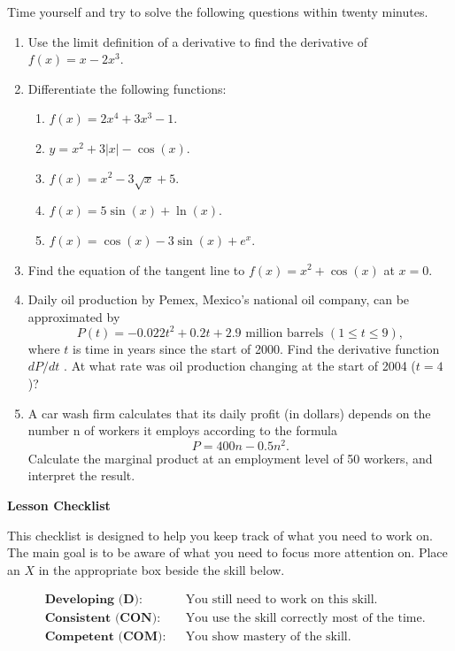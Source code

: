 \documentclass[10pt]{book}
\theoremstyle{definition}
\theoremstyle{remark}
\begin{document}
\begin{large}
\noindent
Time yourself and try to solve the following questions within twenty minutes. 
\begin{enumerate}
\item Use the limit definition of a derivative to find the derivative of $f (x) = x - 2x^3$.\vfil
\item Differentiate the following functions:
\begin{enumerate}
    \item  $f (x) = 2x^4 + 3x^3 -1$. 
    \item  $y = x^2 + 3|x| -\cos(x)$.
    \item  $f (x) = x^2 - 3\sqrt{x} + 5$.
    \item  $f (x) = 5\sin(x) + \ln(x)$.
    \item  $f (x) = \cos(x) - 3\sin(x) + e^x$.
\end{enumerate}\vfil
\item Find the equation of the tangent line to $f(x)=x^{2}+\cos(x)$ at $x=0$.\vfil
\item Daily oil production by Pemex, Mexico’s national oil company, can be approximated by \[P(t) = -0.022t^2 + 0.2t + 2.9 \text{ million barrels } (1 \leq t \leq 9),\] where $t$ is time in years since the start of 2000. Find the derivative function  $dP/dt$ . At what rate was oil production changing at the start of 2004 ($t = 4$)?\vfil
\item A car wash firm calculates that its daily profit (in dollars) depends on the number n of workers it employs according to the formula \[P = 400n - 0.5n^2.\]  Calculate the marginal product at an employment level of 50 workers, and interpret the result.
\end{enumerate}

\noindent
\textbf{Lesson Checklist}
\bigskip

\noindent
This checklist is designed to help you keep track of what you need to work on. The main goal is to be aware of what you need to focus more attention on. Place an $X$ in the appropriate box beside the skill below. 
\bigskip

\noindent
\begin{align*}
&\textbf{Developing (D):} &&\textrm{You still need to work on this skill.}\\
&\textbf{Consistent (CON):} &&\textrm{You use the skill correctly most of the time.}\\
&\textbf{Competent (COM):} &&\textrm{You show mastery of the skill.} 
\end{align*}
\vfil


\end{large}
\end{document}

